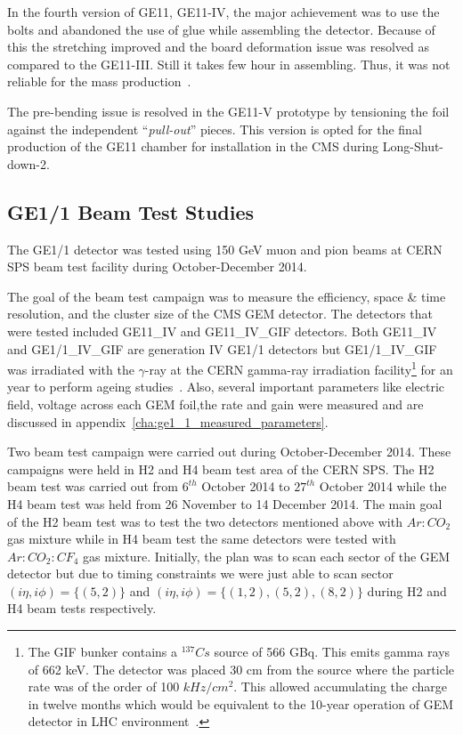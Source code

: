 {\color{red}In the fourth version of GE11, GE11-IV, the major achievement was to use the bolts and abandoned the use of glue while assembling the detector. Because of this the stretching improved and the board deformation issue was resolved as compared to the GE11-III. Still it takes few hour in assembling.}
Thus, it was not reliable for the mass production~\cite{Abbaneo2013}. 

The pre-bending issue is resolved in the GE11-V prototype by tensioning the foil against the independent ``\textit{pull-out}'' pieces. This version is opted for the final production of the GE11 chamber for installation in the CMS during Long-Shut-down-2.

\subsection{GE1/1 Beam Test Studies}
The GE1/1 detector was tested using 150 GeV muon and pion beams at CERN SPS beam test facility during October-December 2014. 

The goal of the beam test campaign was to measure the efficiency, space \& time resolution, and the cluster size of the CMS GEM detector. 
The detectors that were tested included GE11\_IV and GE11\_IV\_GIF detectors.
Both GE11\_IV and GE1/1\_IV\_GIF are generation IV GE1/1 detectors but GE1/1\_IV\_GIF was irradiated with the $\gamma$-ray at the CERN gamma-ray irradiation facility\footnote{The GIF bunker contains a $^{137}Cs$ source of 566 GBq. This emits gamma rays of 662 keV. The detector was placed 30 cm from the source where the particle rate was of the order of 100 $kHz/cm^2$. This allowed accumulating the charge in twelve months which would be equivalent to the 10-year operation of GEM detector in LHC environment~\cite{Merlin2013}.} for an year to perform ageing studies~\cite{Merlin2013}. Also, several important parameters like electric field, voltage across each GEM foil,the rate and gain were measured and are discussed in appendix~\ref{cha:ge1_1_measured_parameters}.

Two beam test campaign were carried out during October-December 2014.
These campaigns were held in H2 and H4 beam test area of the CERN SPS.
The H2 beam test was carried out from $6^{th}$ October 2014 to $27^{th}$ October 2014 while the H4 beam test was held from 26 November to 14 December 2014.
The main goal of the H2 beam test was to test the two detectors mentioned above with $Ar:CO_2$ gas mixture while in H4 beam test the same detectors were tested with $Ar:CO_2:CF_4$ gas mixture.
Initially, the plan was to scan each sector of the GEM detector but due to timing constraints we were just able to scan sector $(i\eta, i\phi)=\{(5,2)\}$ and $(i\eta,i\phi)=\{(1,2),(5,2),(8,2)\}$ during H2 and H4 beam tests respectively.  

